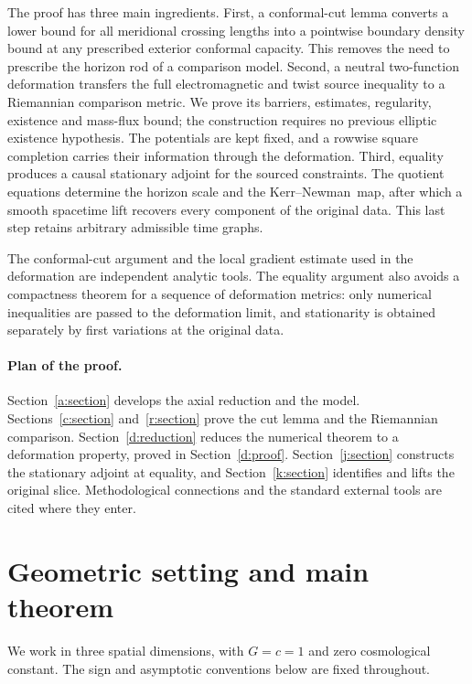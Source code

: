 \documentclass[11pt]{article}
\numberwithin{equation}{section}
\theoremstyle{definition}
\theoremstyle{remark}
\newcommand{\KN}{Kerr--Newman}
\begin{document}
The proof has three main ingredients. First, a conformal-cut lemma converts a
lower bound for all meridional crossing lengths into a pointwise boundary
density bound at any prescribed exterior conformal capacity. This removes the
need to prescribe the horizon rod of a comparison model. Second, a neutral
two-function deformation transfers the full electromagnetic and twist source
inequality to a Riemannian comparison metric. We prove its barriers, estimates,
regularity, existence and mass-flux bound; the construction requires no
previous elliptic existence hypothesis. The potentials are kept fixed, and a
rowwise square completion carries their information through the deformation.
Third, equality produces a causal stationary adjoint for the sourced
constraints. The quotient equations determine the horizon scale and the
\KN\ map, after which a smooth spacetime lift recovers every component of the
original data. This last step retains arbitrary admissible time graphs.

The conformal-cut argument and the local gradient estimate used in the
deformation are independent analytic tools. The equality argument also avoids
a compactness theorem for a sequence of deformation metrics: only numerical
inequalities are passed to the deformation limit, and stationarity is obtained
separately by first variations at the original data.

\paragraph{Plan of the proof.}
Section~\ref{a:section} develops the axial reduction and the model.
Sections~\ref{c:section} and~\ref{r:section} prove the cut lemma and the
Riemannian comparison. Section~\ref{d:reduction} reduces the numerical theorem
to a deformation property, proved in Section~\ref{d:proof}.
Section~\ref{j:section} constructs the stationary adjoint at equality, and
Section~\ref{k:section} identifies and lifts the original slice.
Methodological connections and the standard external tools are cited where
they enter.

\tableofcontents

\section{Geometric setting and main theorem}
\label{m:setting}

We work in three spatial dimensions, with \(G=c=1\) and zero cosmological
constant. The sign and asymptotic conventions below are fixed throughout.
\end{document}
